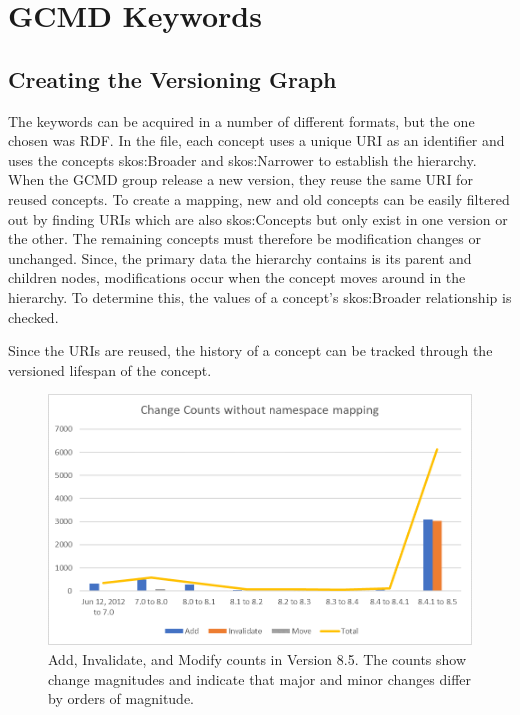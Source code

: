 \section{GCMD Keywords}

\subsection{Creating the Versioning Graph}

The keywords can be acquired in a number of different formats, but the one chosen was RDF.  In the file, each concept uses a unique URI as an identifier and uses the concepts skos:Broader and skos:Narrower to establish the hierarchy.  When the GCMD group release a new version, they reuse the same URI for reused concepts.  To create a mapping, new and old concepts can be easily filtered out by finding URIs which are also skos:Concepts but only exist in one version or the other.  The remaining concepts must therefore be modification changes or unchanged.  Since, the primary data the hierarchy contains is its parent and children nodes, modifications occur when the concept moves around in the hierarchy.  To determine this, the values of a concept's skos:Broader relationship is checked.

Since the URIs are reused, the history of a concept can be tracked through the versioned lifespan of the concept.

\begin{figure}%
	\centering
	\includegraphics[scale=1]{figures/GCMDChart1.png}
	\caption{Add, Invalidate, and Modify counts in Version 8.5.  The counts show change magnitudes and indicate that major and minor changes differ by orders of magnitude.}
	\label{GCMDC1}
\end{figure}

